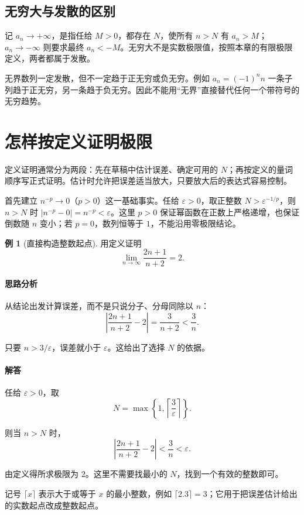 \documentclass[UTF8,fontset=fandol,12pt,oneside,openany]{ctexrep}
\theoremstyle{definition}
\newtheorem{example}{例}[chapter]
\begin{document}
\subsection*{无穷大与发散的区别}

记 $a_n\to+\infty$，是指任给 $M>0$，都存在 $N$，使所有 $n>N$ 有 $a_n>M$；$a_n\to-\infty$ 则要求最终 $a_n<-M$。无穷大不是实数极限值，按照本章的有限极限定义，两者都属于发散。

无界数列一定发散，但不一定趋于正无穷或负无穷。例如 $a_n=(-1)^n n$ 一条子列趋于正无穷，另一条趋于负无穷。因此不能用“无界”直接替代任何一个带符号的无穷趋势。

\section{怎样按定义证明极限}

定义证明通常分为两段：先在草稿中估计误差、确定可用的 $N$；再按定义的量词顺序写正式证明。估计时允许把误差适当放大，只要放大后的表达式容易控制。

首先建立 $n^{-p}\to0$（$p>0$）这一基础事实。任给 $\varepsilon>0$，取正整数 $N>\varepsilon^{-1/p}$，则 $n>N$ 时 $|n^{-p}-0|=n^{-p}<\varepsilon$。这里 $p>0$ 保证幂函数在正数上严格递增，也保证倒数随 $n$ 变小；若 $p=0$，数列恒等于 $1$，不能沿用零极限结论。

\begin{example}[直接构造整数起点]
用定义证明
\[
\lim_{n\to\infty}\frac{2n+1}{n+2}=2.
\]
\end{example}

\paragraph{思路分析} 从结论出发计算误差，而不是只说分子、分母同除以 $n$：
\[
\left|\frac{2n+1}{n+2}-2\right|=\frac3{n+2}<\frac3n.
\]

只要 $n>3/\varepsilon$，误差就小于 $\varepsilon$。这给出了选择 $N$ 的依据。

\paragraph{解答} 任给 $\varepsilon>0$，取
\[
N=\max\left\{1,\left\lceil\frac3\varepsilon\right\rceil\right\}.
\]

则当 $n>N$ 时，
\[
\left|\frac{2n+1}{n+2}-2\right|<\frac3n<\varepsilon.
\]

由定义得所求极限为 $2$。这里不需要找最小的 $N$，找到一个有效的整数即可。

记号 $\lceil x\rceil$ 表示大于或等于 $x$ 的最小整数，例如 $\lceil2.3\rceil=3$；它用于把误差估计给出的实数起点改成整数起点。
\end{document}

